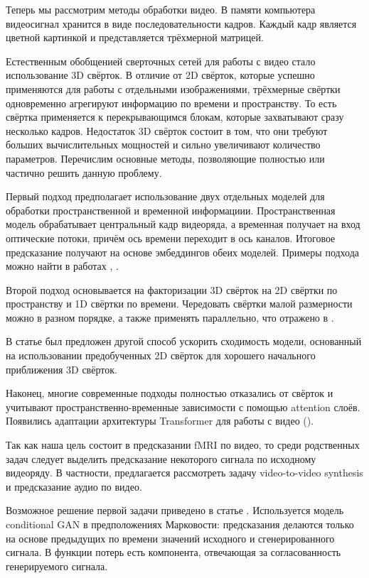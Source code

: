 \documentclass{article}
\begin{document}
Теперь мы рассмотрим методы обработки видео. В памяти компьютера видеосигнал хранится в виде последовательности кадров. Каждый кадр является цветной картинкой и представляется трёхмерной матрицей.

Естественным обобщенией сверточных сетей для работы с видео стало использование 3D свёрток. В отличие от 2D свёрток, которые успешно применяются для работы с отдельными изображениями, трёхмерные свёртки одновременно агрегируют информацию по времени и пространству. То есть свёртка применяется к перекрывающимся блокам, которые захватывают сразу несколько кадров. Недостаток 3D свёрток состоит в том, что они требуют больших вычислительных мощностей и сильно увеличивают количество параметров. Перечислим основные методы, позволяющие полностью или частично решить данную проблему. 

Первый подход предполагает использование двух отдельных моделей для обработки пространственной и временной информациии. Пространственная модель обрабатывает центральный кадр видеоряда, а временная получает на вход оптические потоки, причём ось времени переходит в ось каналов. Итоговое предсказание получают на основе эмбеддингов обеих моделей. Примеры  подхода можно найти в работах \cite{twostream}, \cite{inflated}. 

Второй подход основывается на факторизации 3D свёрток на 2D свёртки по пространству и 1D свёртки по времени. Чередовать свёртки малой размерности можно в разном порядке, а также применять параллельно, что отражено в \cite{fact3d}.

В статье \cite{inflated} был предложен другой способ ускорить сходимость модели, основанный на использовании предобученных 2D свёрток для хорошего начального приближения 3D свёрток.

Наконец, многие современные подходы полностью отказались от свёрток и учитывают пространственно-временные зависимости с помощью attention слоёв. Появились адаптации архитектуры Transformer для работы с видео (\cite{transformer}).

Так как наша цель состоит в предсказании fMRI по видео, то среди родственных задач следует выделить предсказание некоторого сигнала по исходному видеоряду. В частности, предлагается рассмотреть задачу video-to-video synthesis и предсказание аудио по видео.

Возможное решение первой задачи приведено в статье \cite{vidtovid}. Используется модель conditional GAN в предположениях Марковости: предсказания делаются только на основе предыдущих по времени значений исходного и сгенерированного сигнала. В функции потерь есть компонента, отвечающая за согласованность генерируемого сигнала.
\end{document}

